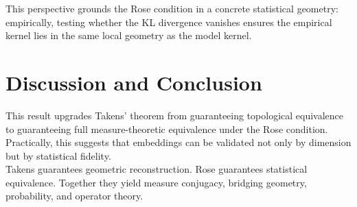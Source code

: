 \documentclass[11pt]{article}
\begin{document}
This perspective grounds the Rose condition in a concrete statistical geometry: empirically, testing whether the KL divergence vanishes ensures the empirical kernel lies in the same local geometry as the model kernel.


\section{Discussion and Conclusion}
This result upgrades Takens' theorem from guaranteeing topological equivalence to guaranteeing full measure-theoretic equivalence under the Rose condition. Practically, this suggests that embeddings can be validated not only by dimension but by statistical fidelity.\\

Takens guarantees geometric reconstruction. Rose guarantees statistical equivalence. Together they yield measure conjugacy, bridging geometry, probability, and operator theory.
\end{document}
